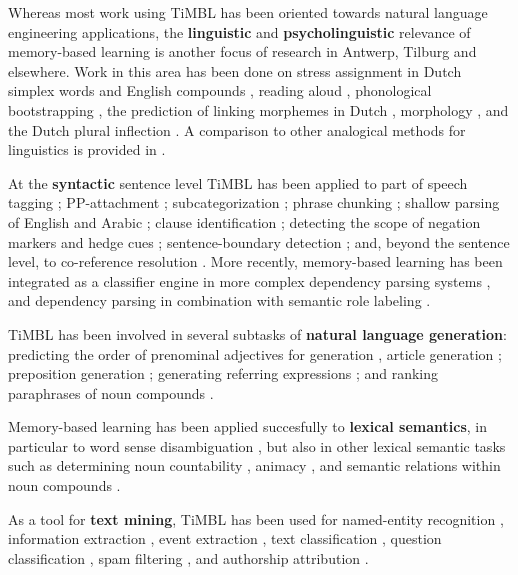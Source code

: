 \documentclass{book}
\begin{document}
Whereas most work using TiMBL has been oriented towards natural
language engineering applications, the {\bf linguistic} and {\bf psycholinguistic}
relevance of memory-based learning is another focus of research in
Antwerp, Tilburg and elsewhere. Work in this area has been done on
stress assignment in Dutch simplex words \cite{Daelemans+94,Gillis+00}
and English compounds \cite{Plag+07}, reading aloud
\cite{VandenBosch+00b}, phonological bootstrapping \cite{Durieux+00},
the prediction of linking morphemes in Dutch \cite{Krott+01},
morphology \cite{Eddington00,Eddington03}, and the Dutch plural
inflection \cite{Keuleers+07}. A comparison to other analogical
methods for linguistics is provided in
\cite{Daelemans+97f,Daelemans02}.

At the {\bf syntactic} sentence level TiMBL has been applied to part
of speech tagging \cite{Daelemans+96b,Zavrel+99,Halteren+01};
PP-attachment \cite{Zavrel+97b}; subcategorization \cite{Buchholz98};
phrase chunking \cite{Veenstra98,Sang+99}; shallow parsing of English
\cite{Daelemans+99a,Buchholz+99,Yeh00} and Arabic \cite{Azmi+10};
clause identification \cite{Orasan00,Sang01}; detecting the scope of
negation markers and hedge cues \cite{Morante+08c,Morante+09c};
sentence-boundary detection \cite{Stevenson+00}; and, beyond the
sentence level, to co-reference resolution
\cite{Preiss02,Mitkov+02,Hoste05,Klenner+08,Wunsch+09,Zhekova+11}. More recently,
memory-based learning has been integrated as a classifier engine in
more complex dependency parsing systems
\cite{Nivre+04,Sagae+05,Canisius+06b}, and dependency parsing in
combination with semantic role labeling \cite{Morante+09b}.

TiMBL has been involved in several subtasks of {\bf natural language
  generation}: predicting the order of prenominal adjectives for
generation \cite{Malouf00}, article generation \cite{Minnen+00};
preposition generation \cite{Lee+08b}; generating referring
expressions \cite{Hendrickx+08}; and ranking paraphrases of noun
compounds \cite{Wubben10}.

Memory-based learning has been applied succesfully to {\bf lexical
semantics}, in particular to word sense disambiguation
\cite{Veenstra+00,Stevenson+99,Kokkinakis00,Mihalcea02,Hoste+02,DeCadt+04},
but also in other lexical semantic tasks such as determining noun
countability \cite{Baldwin+03}, animacy \cite{Orasan+01}, and semantic
relations within noun compounds \cite{Kim+06b,Nastase+06}.

As a tool for {\bf text mining}, TiMBL has been used for named-entity
recognition
\cite{Buchholz+00,Hendrickx+03,DeMeulder+03,Sporleder+06b,Leveling+06},
information extraction \cite{Zavrel+00b,Zavrel+03,Ahn06}, event
extraction \cite{Morante+09d}, text classification \cite{Spitters00},
question classification \cite{Garcia+06,Dridan+07}, spam filtering
\cite{Androutsopoulos+00}, and authorship attribution
\cite{Luyckx+08,Kestemont+09}.
\end{document}
